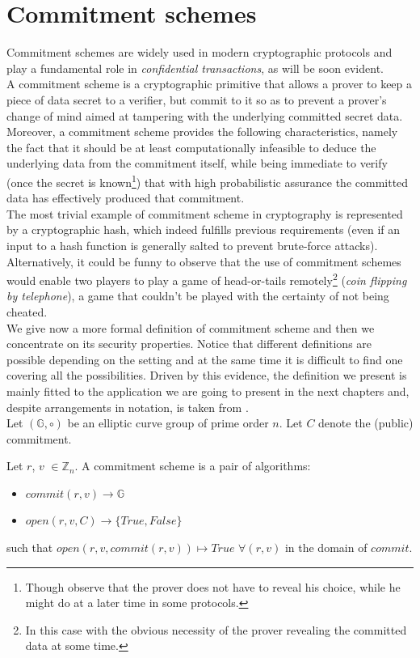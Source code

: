 \section{Commitment schemes}
Commitment schemes are widely used in modern cryptographic protocols and play a fundamental role in \textit{confidential transactions}, as will be soon evident.\\
A commitment scheme is a cryptographic primitive that allows a prover to keep a piece of data secret to a verifier, but commit to it so as to prevent a prover's change of mind aimed at tampering with the underlying committed secret data. Moreover, a commitment scheme provides the following characteristics, namely the fact that it should be at least computationally infeasible to deduce the underlying data from the commitment itself, while being immediate to verify (once the secret is known\footnote{Though observe that the prover does not have to reveal his choice, while he might do at a later time in some protocols.}) that with high probabilistic assurance the committed data has effectively produced that commitment.\\
The most trivial example of commitment scheme in cryptography is represented by a cryptographic hash, which indeed fulfills previous requirements (even if an input to a hash function is generally salted to prevent brute-force attacks). Alternatively, it could be funny to observe that the use of commitment schemes would enable two players to play a game of head-or-tails remotely\footnote{In this case with the obvious necessity of the prover revealing the committed data at some time.} (\textit{coin flipping by telephone}), a game that couldn't be played with the certainty of not being cheated.\\
We give now a more formal definition of commitment scheme and then we concentrate on its security properties. Notice that different definitions are possible depending on the setting and at the same time it is difficult to find one covering all the possibilities. Driven by this evidence, the definition we present is mainly fitted to the application we are going to present in the next chapters and, despite arrangements in notation, is taken from \cite{PoeMW}.\\
Let $(\mathbb{G}, \circ)$ be an elliptic curve group of prime order $n$. Let $C$ denote the (public) commitment.
\begin{mydef}
\label{commitement}
    Let $r$, $v$ $\in \mathbb{Z}_n$. A commitment scheme is a pair of algorithms: \begin{itemize}
        \item $commit(r,v) \rightarrow \mathbb{G}$
        \item $open(r,v,C) \rightarrow \{True, False\}$
    \end{itemize}
    such that $open(r,v,commit(r,v)) \mapsto True$ $\forall (r,v)$ in the domain of $commit$.
\end{mydef}
